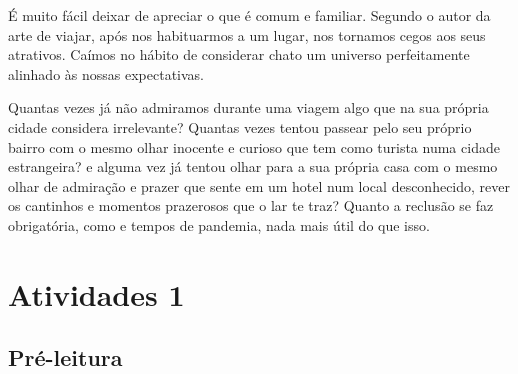 \documentclass[12pt]{extarticle}
\begin{document}
É muito fácil deixar de apreciar o que é comum e familiar. Segundo o autor da arte de viajar, após nos habituarmos a um lugar, nos tornamos cegos aos seus atrativos. Caímos no hábito de considerar chato um universo perfeitamente alinhado às nossas expectativas.

Quantas vezes já não admiramos durante uma viagem algo que na sua própria cidade considera irrelevante? Quantas vezes tentou passear pelo seu próprio bairro com o mesmo olhar inocente e curioso que tem como turista numa cidade estrangeira? e alguma vez já tentou olhar para a sua própria casa com o mesmo olhar de admiração e prazer que sente em um hotel num local desconhecido, rever os cantinhos e momentos prazerosos que o lar te traz? Quanto a reclusão se faz obrigatória, como e tempos de pandemia, nada mais útil do que isso. 



\section{Atividades 1}


\subsection{Pré-leitura}


\end{document}
